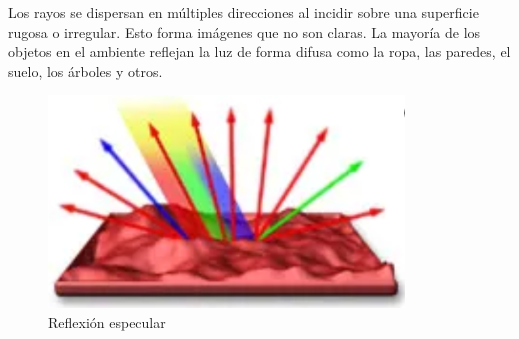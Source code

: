 Los rayos se dispersan en múltiples direcciones al incidir sobre una superficie rugosa o irregular. Esto forma imágenes que no son claras. La mayoría de los objetos en el ambiente reflejan la luz de forma difusa como la ropa, las paredes, el suelo, los árboles y otros.

\begin{figure}[H]
  \centering
  \includegraphics[scale=0.5]{imagenes/reflexion_difusa.png}
  \caption{Reflexión especular\cite{sncrflspcdif}}
\end{figure}
